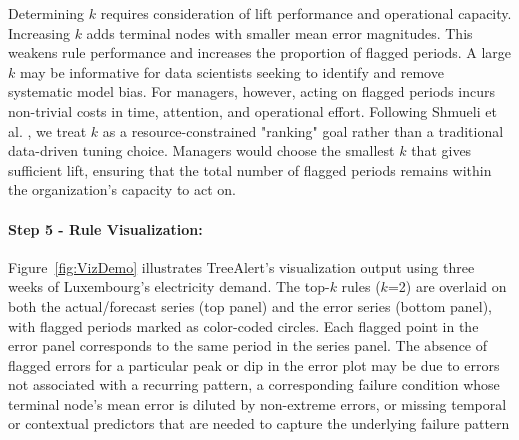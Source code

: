 \documentclass[]{interact}
\theoremstyle{definition}
\begin{document}
Determining $k$ requires consideration of lift performance and operational capacity. Increasing $k$ adds %
terminal nodes with %
smaller mean error magnitudes. This weakens rule performance and increases the proportion of flagged periods. A large $k$ may be informative for data scientists seeking to identify and remove systematic model bias. For managers, however, acting on flagged periods incurs non-trivial costs in time, attention, and operational effort. Following Shmueli et al. \citep{shmueli2023machineR}, we treat $k$ as a resource-constrained "ranking" goal rather than a traditional data-driven tuning choice. %
Managers would choose the smallest $k$ that gives sufficient lift, ensuring that the total number of flagged periods remains within the organization's capacity to act on.


\paragraph*{Step 5 - Rule Visualization:}
\label{subsec-step5}

Figure~\ref{fig:VizDemo} illustrates TreeAlert's visualization output using three weeks of Luxembourg's electricity demand. The top-$k$ rules ($k$=2) are overlaid on both the actual/forecast series (top panel) and the error series (bottom panel), with flagged periods marked as color-coded circles. Each flagged point in the error panel corresponds to the same period in the series panel. The absence of flagged errors for a particular peak or dip in the error plot may be due to errors not associated with a recurring pattern, a corresponding failure condition whose terminal node's mean error is diluted by non-extreme errors, or missing temporal or contextual predictors that are needed to capture the underlying failure pattern
\end{document}
